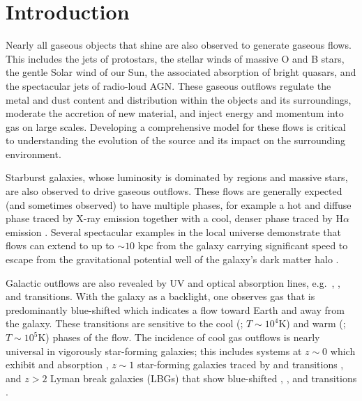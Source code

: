 \documentclass[12pt,preprint]{aastex}
\begin{document}

\section{Introduction}
\label{sec:intro}

Nearly all gaseous objects that shine are also
observed to generate gaseous flows.  This includes the jets of protostars, the
stellar winds of massive O and B stars, the gentle Solar wind
of our Sun, the associated absorption of bright quasars, and the
spectacular jets of radio-loud AGN.   These gaseous outflows 
regulate the metal and dust content and distribution within the 
objects and its surroundings, 
moderate the accretion of new material, and %
inject energy and momentum into gas on large scales. %
Developing a comprehensive model for these flows is critical to
understanding the evolution of the source and its impact on the
surrounding environment.

Starburst galaxies, whose luminosity is dominated by  regions
and massive stars, are also observed to drive gaseous outflows.  These
flows are generally expected (and sometimes observed) to have multiple
phases, for example a hot and diffuse phase traced by X-ray emission
together with a cool, denser phase traced by H$\alpha$ emission 
\citep[e.g.][]{ham90,martin99,shc+04,km10}. 
Several spectacular
examples in the local universe demonstrate that flows can extend to
up to $\sim 10$ kpc
from the galaxy \citep{lhw99,wsg08,vsr+03} carrying significant speed
to escape from the gravitational potential well of the galaxy's dark
matter halo \citep[e.g.][]{sh09}.

Galactic outflows are also
revealed by UV and optical absorption lines, e.g.\ ,
,  and  transitions.  With the galaxy
as a backlight, one observes gas that is predominantly
blue-shifted which indicates a flow toward
Earth and away from the galaxy.  These transitions are sensitive to
the cool (; $T \sim 10^4$K) and warm (; $T \sim
10^5$K) phases of the flow.  
The incidence of cool gas outflows is
nearly universal in 
vigorously
star-forming galaxies;  this includes systems at $z \sim 0$
which exhibit  and  absorption
\citep{rvs05a,martin05,smn+09,mb09,cth+10}, 
$z \sim 1$ star-forming galaxies traced by
 and  transitions \citep{wcp+09,rwk+10}, and
$z>2$ Lyman break galaxies (LBGs) that show blue-shifted ,
, and  transitions \citep{sgp+96,lkg+97,shapley03}.
\end{document}
